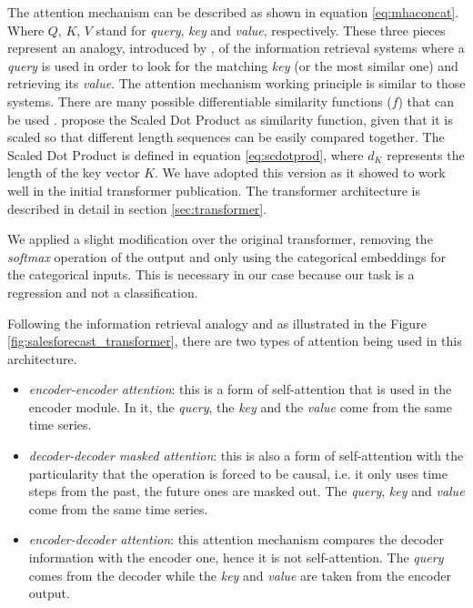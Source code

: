 The attention mechanism can be described as shown in equation \ref{eq:mhaconcat}. Where $Q$, $K$, $V$ stand for \textit{query}, \textit{key} and \textit{value}, respectively. These three pieces represent an analogy, introduced by \autocite{vaswani2017}, of the information retrieval systems where a \textit{query} is used in order to look for the matching \textit{key} (or the most similar one) and retrieving its \textit{value}. The attention mechanism working principle is similar to those systems. There are many possible differentiable similarity functions ($f$) that can be used \autocite{uday2019}. \autocite{vaswani2017} propose the Scaled Dot Product as similarity function, given that it is scaled so that different length sequences can be easily compared together. The Scaled Dot Product is defined in equation \ref{eq:scdotprod},  where $d_K$ represents the length of the key vector $K$. We have adopted this version as it showed to work well in the initial transformer publication. The transformer architecture is described in detail in section \ref{sec:transformer}.

We applied a slight modification over the original transformer, removing the \textit{softmax} operation of the output and only using the categorical embeddings for the categorical inputs. This is necessary in our case because our task is a regression and not a classification.

Following the information retrieval analogy and as illustrated in the Figure \ref{fig:salesforecast_transformer}, there are two types of attention being used in this architecture.
\begin{itemize}
	\item \textit{encoder-encoder attention}: this is a form of self-attention that is used in the encoder module. In it, the \textit{query}, the \textit{key} and the \textit{value} come from the same time series.
	\item \textit{decoder-decoder masked attention}: this is also a form of self-attention with the particularity that the operation is forced to be causal, i.e. it only uses time steps from the past, the future ones are masked out. The \textit{query}, \textit{key} and \textit{value} come from the same time series.
	\item \textit{encoder-decoder attention}: this attention mechanism compares the decoder information with the encoder one, hence it is not self-attention. The \textit{query} comes from the decoder while the \textit{key} and \textit{value} are taken from the encoder output.
\end{itemize}

